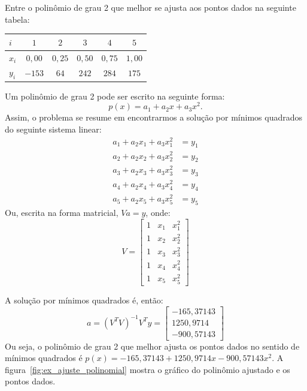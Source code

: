 \begin{ex}\label{ex:ajuste_polinomial} Entre o polinômio de grau 2 que melhor se ajusta aos pontos dados na seguinte tabela:
  \begin{center}
    \begin{tabular}{l|ccccc}
      $i$ & $1$ & $2$ & $3$ & $4$ & $5$\\\hline
      $x_i$ & $0,00$ & $0,25$ & $0,50$ & $0,75$ & $1,00$\\
      $y_i$ & $-153$ & $64$ & $242$ & $284$ & $175$
    \end{tabular}
  \end{center} 
\end{ex}
\begin{sol}
Um polinômio de grau 2 pode ser escrito na seguinte forma:
\begin{equation*}
  p(x) = a_1 + a_2x + a_3x^2.
\end{equation*}
Assim, o problema se resume em encontrarmos a solução por mínimos quadrados do seguinte sistema linear:
\begin{equation*}
  \begin{split}
  a_1 + a_2x_1 + a_3x_1^2 &= y_1\\
  a_2 + a_2x_2 + a_3x_2^2 &= y_2\\
  a_3 + a_2x_3 + a_3x_3^2 &= y_3\\
  a_4 + a_2x_4 + a_3x_4^2 &= y_4\\
  a_5 + a_2x_5 + a_3x_5^2 &= y_5    
  \end{split}
\end{equation*}
Ou, escrita na forma matricial, $Va = y$, onde:
\begin{equation*}
  V =
  \begin{bmatrix}
    1 & x_1 & x_1^2\\
    1 & x_2 & x_2^2\\
    1 & x_3 & x_3^2\\
    1 & x_4 & x_4^2\\
    1 & x_5 & x_5^2
  \end{bmatrix}
\end{equation*}

A solução por mínimos quadrados é, então:
\begin{equation*}
  a = (V^TV)^{-1}V^Ty =
  \begin{bmatrix}
    - 165,37143 \\
    1250,9714  \\
  - 900,57143  
  \end{bmatrix}
\end{equation*}
Ou seja, o polinômio de grau 2 que melhor ajusta os pontos dados no sentido de mínimos quadrados é $p(x) = -165,37143 + 1250,9714x -900,57143x^2$. A figura~\ref{fig:ex_ajuste_polinomial} mostra o gráfico do polinômio ajustado e os pontos dados.


\end{sol}
